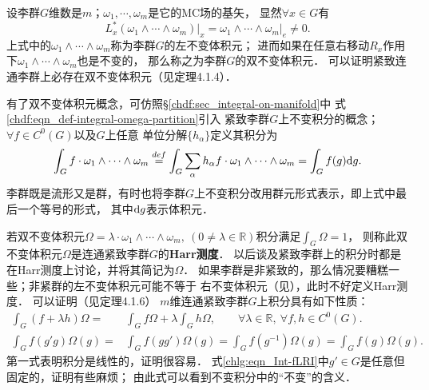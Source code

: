 设李群$G$维数是$m$；$\omega_1,\cdots,\omega_m$是它的MC场的基矢，
显然$\forall x\in G$有
\begin{equation}
    L_x^* (\omega_1 \wedge\cdots\wedge\omega_m)|_{x} = \left.\omega_1 \wedge\cdots\wedge\omega_m\right|_{e}
    \neq 0.
\end{equation}
上式中的$\omega_1 \wedge\cdots\wedge\omega_m$称为李群$G$的左不变体积元；
进而如果在任意右移动$R_x$作用下$\omega_1 \wedge\cdots\wedge\omega_m$也是不变的，
那么称之为李群$G$的{\heiti 双不变体积元}．
可以证明紧致连通李群上必存在双不变体积元（见\parencite[p. 288]{xuyc-2001}定理4.1.4）．


有了双不变体积元概念，可仿照\S\ref{chdf:sec_integral-on-manifold}中
式\eqref{chdf:eqn_def-integral-omega-partition}引入
紧致李群$G$上{\heiti 不变积分}的概念；$\forall f\in C^0(G)$以及$G$上任意
单位分解$\{h_\alpha\}$定义其积分为
\begin{equation}
    \int_{G} f \cdot \omega_1 \wedge\cdots\wedge\omega_m \overset{def}{=} 
    \int_{G} \sum_{\alpha}  h_\alpha f \cdot  \omega_1 \wedge\cdots\wedge\omega_m 
    =\int_{G} f(g) {\rm d}g .
\end{equation}
李群既是流形又是群，有时也将李群$G$上不变积分改用群元形式表示，即上式中最后一个等号的形式，
其中${\rm d}g$表示体积元．



若双不变体积元$\Omega=\lambda \cdot \omega_1 \wedge\cdots\wedge\omega_m,\ 
(0\neq\lambda\in \mathbb{R})$积分满足$\int_{G}\Omega {=} 1$，
则称此双不变体积元$\Omega$是连通紧致李群$G$的{\heiti \bfseries Harr测度}．
以后谈及紧致李群上的积分时都是在Harr测度上讨论，并将其简记为$\Omega$．
如果李群是非紧致的，那么情况要糟糕一些；非紧群的左不变体积元可能不等于
右不变体积元（见\parencite[\S 6.1]{Miller-1973}），此时不好定义Harr测度．
可以证明（见\parencite[p.289]{xuyc-2001}定理4.1.6）
$m$维连通紧致李群$G$上积分具有如下性质：
\setlength{\mathindent}{0em}
\begin{align}
    \int_{G} (f+\lambda h) \Omega =& \int_{G} f \Omega +\lambda \int_{G}  h \Omega,
    \qquad \forall \lambda\in \mathbb{R},\  \forall f,h\in C^0(G). \\
    \int_{G} f(g' g) \Omega(g)=& \int_{G} f(g g') \Omega(g)
    = \int_{G} f(g^{-1}) \Omega(g) = \int_{G} f(g) \Omega(g) .
    \label{chlg:eqn_Int-fLRI}
\end{align}\setlength{\mathindent}{2em}
第一式表明积分是线性的，证明很容易．
式\eqref{chlg:eqn_Int-fLRI}中$g'\in G$是任意但固定的，证明有些麻烦；
由此式可以看到不变积分中的“不变”的含义． 


